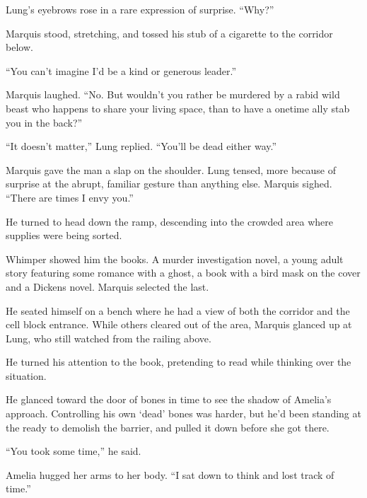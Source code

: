 Lung's eyebrows rose in a rare expression of surprise.  ``Why?''



Marquis stood, stretching, and tossed his stub of a cigarette to the corridor below.



``You can't imagine I'd be a kind or generous leader.''



Marquis laughed.  ``No.  But wouldn't you rather be murdered by a rabid wild beast who happens to share your living space, than to have a onetime ally stab you in the back?''



``It doesn't matter,'' Lung replied.  ``You'll be dead either way.''



Marquis gave the man a slap on the shoulder.  Lung tensed, more because of surprise at the abrupt, familiar gesture than anything else.  Marquis sighed.  ``There are times I envy you.''



He turned to head down the ramp, descending into the crowded area where supplies were being sorted.



Whimper showed him the books.  A murder investigation novel, a young adult story featuring some romance with a ghost, a book with a bird mask on the cover and a Dickens novel.  Marquis selected the last.



He seated himself on a bench where he had a view of both the corridor and the cell block entrance.  While others cleared out of the area, Marquis glanced up at Lung, who still watched from the railing above.



He turned his attention to the book, pretending to read while thinking over the situation.



\blacksquare



He glanced toward the door of bones in time to see the shadow of Amelia's approach.  Controlling his own `dead' bones was harder, but he'd been standing at the ready to demolish the barrier, and pulled it down before she got there.



``You took some time,'' he said.



Amelia hugged her arms to her body.  ``I sat down to think and lost track of time.''



